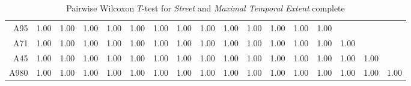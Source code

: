 \begin{table}[ht!]
\begin{tabular}{rrrrrrrrrrrrrrrrr}
            A95 	& 1.00 & 1.00 & 1.00 & 1.00 & 1.00 & 1.00 & 1.00 & 1.00 & 1.00 & 1.00 & 1.00 & 1.00 & 1.00 &  &  &  \\ 
            A71 	& 1.00 & 1.00 & 1.00 & 1.00 & 1.00 & 1.00 & 1.00 & 1.00 & 1.00 & 1.00 & 1.00 & 1.00 & 1.00 & 1.00 &  &  \\ 
            A45 	& 1.00 & 1.00 & 1.00 & 1.00 & 1.00 & 1.00 & 1.00 & 1.00 & 1.00 & 1.00 & 1.00 & 1.00 & 1.00 & 1.00 & 1.00 &  \\ 
            A980 	& 1.00 & 1.00 & 1.00 & 1.00 & 1.00 & 1.00 & 1.00 & 1.00 & 1.00 & 1.00 & 1.00 & 1.00 & 1.00 & 1.00 & 1.00 & 1.00 \\ 
            \bottomrule
        \end{tabular}
        \caption{Pairwise Wilcoxon $T$-test for \textit{Street} and \textit{Maximal Temporal Extent} complete}
        \label{tbl:wilcoxon_baysis_matched_Str_TMax_complete}
    \end{table}

